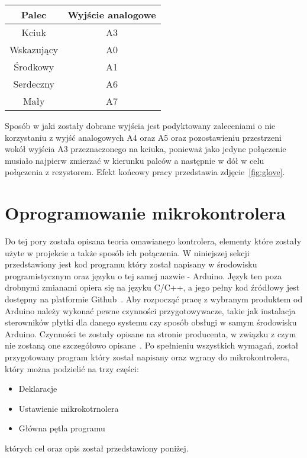 \begin{center}
\begin{tabular}{|c|c|}
\hline
Palec & Wyjście analogowe \\ \hline
Kciuk & A3 \\ \hline
Wskazujący & A0 \\ \hline
Środkowy & A1 \\ \hline
Serdeczny & A6 \\ \hline
Mały & A7 \\ \hline
\hline
\end{tabular}
\end{center}

Sposób w jaki zostały dobrane wyjścia jest podyktowany zaleceniami o nie korzystaniu z wyjść analogowych A4 oraz A5 oraz pozostawieniu przestrzeni wokół wyjścia A3 przeznaczonego na kciuka, ponieważ jako jedyne połączenie musiało najpierw zmierzać w kierunku palców a następnie w dół w celu połączenia z rezystorem. Efekt końcowy pracy przedstawia zdjęcie~\ref{fig:glove}.

\section{Oprogramowanie mikrokontrolera}
\label{sec:oprogramowanie}


Do tej pory została opisana teoria omawianego kontrolera, elementy które zostały użyte w projekcie a także sposób ich połączenia. W niniejszej sekcji przedstawiony jest kod programu który został napisany w środowisku programistycznym oraz języku o tej samej nazwie - Arduino. Język ten poza drobnymi zmianami opiera się na języku C/C++, a jego pełny kod źródłowy jest dostępny na platformie Github~\cite{jArduino}. Aby rozpocząć pracę z wybranym produktem od Arduino należy wykonać pewne czynności przygotowywacze, takie jak instalacja sterowników płytki dla danego systemu czy sposób obsługi w samym środowisku Arduino. Czynności te zostały opisane na stronie producenta, w związku z czym nie zostaną one szczegółowo opisane~\cite{guideArduino}. Po spełnieniu wszystkich wymagań, został przygotowany program który został napisany oraz wgrany do mikrokontrolera, który można podzielić na trzy części:
\begin{itemize}
\item Deklaracje
\item Ustawienie mikrokotrnolera
\item Główna pętla programu
\end{itemize}
których cel oraz opis został przedstawiony poniżej.

